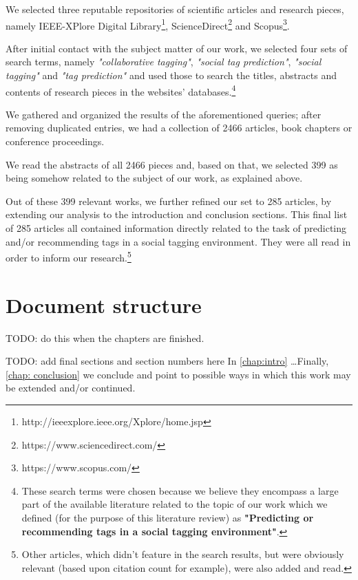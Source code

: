 We selected three reputable repositories of scientific articles and research pieces, namely IEEE-XPlore Digital Library\footnote{http://ieeexplore.ieee.org/Xplore/home.jsp}, ScienceDirect\footnote{https://www.sciencedirect.com/} and Scopus\footnote{https://www.scopus.com/}.

After initial contact with the subject matter of our work, we selected four sets of search terms, namely \textit{"collaborative tagging"}, \textit{"social tag prediction"}, \textit{"social tagging"} and \textit{"tag prediction"} and used those to search the titles, abstracts and contents of research pieces in the websites' databases.\footnote{These search terms were chosen because we believe they encompass a large part  of the available literature related to the topic of our work which we defined (for the purpose of this literature review) as \textbf{"Predicting or recommending tags in a social tagging environment"}.} 

We gathered and organized the results of the aforementioned queries; after removing duplicated entries, we had a collection of 2466 articles, book chapters or conference proceedings.

We read the abstracts of all 2466 pieces and, based on that, we selected 399 as being somehow related to the subject of our work, as explained above.

Out of these 399 relevant works, we further refined our set to 285 articles, by extending our analysis to the introduction and conclusion sections. This final list of 285 articles all contained information directly related to the task of predicting and/or recommending tags in a social tagging environment. They were all read in order to inform our research.\footnote{Other articles, which didn't feature in the search results, but were obviously relevant (based upon citation count for example), were also added and read.}


\section{Document structure}\label{section:intro_structure}

{\color{red} TODO: do this when the chapters are finished.}

{\color{red} TODO: add final sections and section numbers here In \autoref{chap:intro} \ldots Finally, \autoref{chap: conclusion} we conclude and point to possible ways in which this work may be extended and/or continued.}



